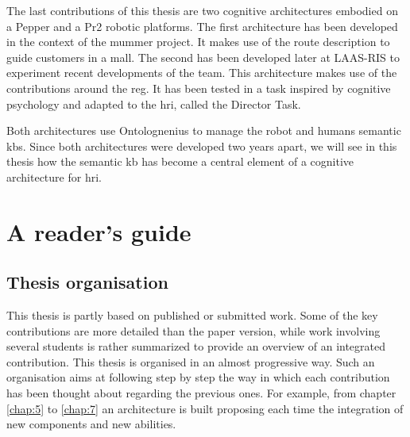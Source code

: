 The last contributions of this thesis are two cognitive architectures embodied on a Pepper and a Pr2 robotic platforms. The first architecture has been developed in the context of the \acrlong{mummer} project. It makes use of the route description to guide customers in a mall. The second has been developed later at LAAS-RIS to experiment recent developments of the team. This architecture makes use of the contributions around the \acrlong{reg}. It has been tested in a task inspired by cognitive psychology and adapted to the \acrlong{hri}, called the Director Task.

Both architectures use Ontolognenius to manage the robot and humans semantic \acrshort{kb}s. Since both architectures were developed two years apart, we will see in this thesis how the semantic \acrlong{kb} has become a central element of a cognitive architecture for \acrlong{hri}.

\section{A reader's guide}

\subsection*{Thesis organisation}

This thesis is partly based on published or submitted work. Some of the key contributions are more detailed than the paper version, while work involving several students is rather summarized to provide an overview of an integrated contribution.
This thesis is organised in an almost progressive way. Such an organisation aims at following step by step the way in which each contribution has been thought about regarding the previous ones. For example, from chapter \ref{chap:5} to \ref{chap:7} an architecture is built proposing each time the integration of new components and new abilities. 

